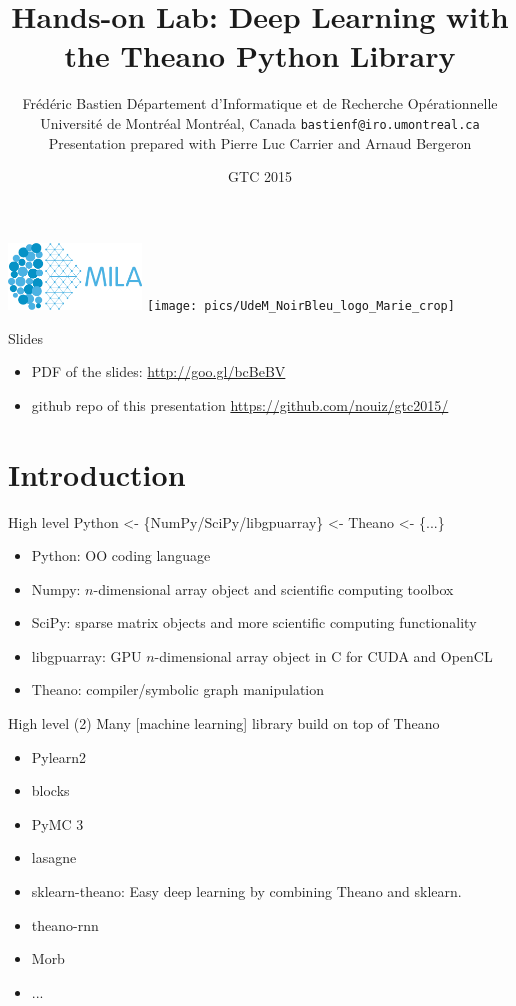\documentclass[utf8x,xcolor=pdftex,dvipsnames,table]{beamer}
\title{Hands-on Lab: Deep Learning with the Theano Python Library}
\author{%
\footnotesize
Frédéric Bastien \newline
\newline
\newline
Département d'Informatique et de Recherche Opérationnelle \newline
Université de Montréal \newline
Montréal, Canada \newline
\texttt{bastienf@iro.umontreal.ca} \newline \newline
Presentation prepared with Pierre Luc Carrier and Arnaud Bergeron
}
\date{GTC 2015}
\begin{document}
\begin{frame}[plain]
 \titlepage
 \vspace{-5em}
 \includegraphics[width=1.4in]{pics/mila.png}
 \hfill
 \texttt{[image: pics/UdeM\_NoirBleu\_logo\_Marie\_crop]}
\end{frame}

\begin{frame}{Slides}
\begin{itemize}
 \item PDF of the slides: \url{http://goo.gl/bcBeBV}
 \item github repo of this presentation \url{https://github.com/nouiz/gtc2015/}
\end{itemize}
\end{frame}

\section{Introduction}
\begin{frame}
  \tableofcontents[currentsection]
\end{frame}

\begin{frame}{High level}\setcounter{page}{1}
  Python <- \{NumPy/SciPy/libgpuarray\} <- Theano <- \{...\}
  \begin{itemize}
  \item Python: OO coding language
  \item Numpy: $n$-dimensional array object and scientific computing toolbox
  \item SciPy: sparse matrix objects and more scientific computing functionality
  \item libgpuarray: GPU $n$-dimensional array object in C for CUDA and OpenCL
  \item Theano: compiler/symbolic graph manipulation
  \end{itemize}
\end{frame}

\begin{frame}{High level (2)}
  Many [machine learning] library build on top of Theano
  \begin{itemize}
  \item Pylearn2
  \item blocks
  \item PyMC 3
  \item lasagne
  \item sklearn-theano: Easy deep learning by combining Theano and sklearn.
  \item theano-rnn
  \item Morb
  \item ...
  \end{itemize}
\end{frame}
\end{document}
